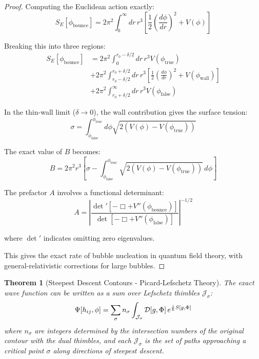 \documentclass{article}
\newtheorem{theorem}{Theorem}
\begin{document}
\begin{proof}
Computing the Euclidean action exactly:
\begin{equation}
S_E[\phi_\text{bounce}] = 2\pi^2\int_0^\infty dr \, r^3\left[\frac{1}{2}\left(\frac{d\phi}{dr}\right)^2 + V(\phi)\right]
\end{equation}

Breaking this into three regions:
\begin{equation}
\begin{split}
S_E[\phi_\text{bounce}] &= 2\pi^2\int_0^{r_0-\delta/2} dr \, r^3 V(\phi_\text{true}) \\
&+ 2\pi^2\int_{r_0-\delta/2}^{r_0+\delta/2} dr \, r^3\left[\frac{1}{2}\left(\frac{d\phi}{dr}\right)^2 + V(\phi_\text{wall})\right] \\
&+ 2\pi^2\int_{r_0+\delta/2}^\infty dr \, r^3 V(\phi_\text{false})
\end{split}
\end{equation}

In the thin-wall limit ($\delta \to 0$), the wall contribution gives the surface tension:
\begin{equation}
\sigma = \int_{\phi_\text{false}}^{\phi_\text{true}} d\phi \sqrt{2(V(\phi) - V(\phi_\text{true}))}
\end{equation}

The exact value of $B$ becomes:
\begin{equation}
B = 2\pi^2 r^3\left[\sigma - \int_{\phi_\text{false}}^{\phi_\text{true}}\sqrt{2(V(\phi) - V(\phi_\text{true}))} \, d\phi\right]
\end{equation}

The prefactor $A$ involves a functional determinant:
\begin{equation}
A = \left|\frac{\det'[-\Box + V''(\phi_\text{bounce})]}{\det[-\Box + V''(\phi_\text{false})]}\right|^{-1/2}
\end{equation}

where $\det'$ indicates omitting zero eigenvalues.

This gives the exact rate of bubble nucleation in quantum field theory, with general-relativistic corrections for large bubbles.
\end{proof}

\begin{theorem}[Steepest Descent Contours - Picard-Lefschetz Theory]
  The exact wave function can be written as a sum over Lefschetz thimbles
  $\mathcal{J}_{\sigma}$:
  \begin{equation}
    \Psi [h_{ij}, \phi] = \sum_{\sigma} n_{\sigma} 
    \int_{\mathcal{J}_{\sigma}} \mathcal{D} [g, \Phi]  \hspace{0.17em}
    e^{\frac{i}{\hbar} S [g, \Phi]}
  \end{equation}
  where $n_{\sigma}$ are integers determined by the intersection numbers of
  the original contour with the dual thimbles, and each $\mathcal{J}_{\sigma}$
  is the set of paths approaching a critical point $\sigma$ along directions
  of steepest descent.
\end{theorem}
\end{document}
